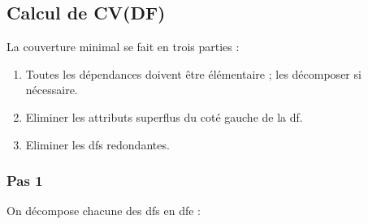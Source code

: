 \documentclass[a4paper,sffamily,12pt]{article}
\begin{document}
		\subsection{Calcul de CV(DF)}

			\vspace{0.5cm}

			\noindent La couverture minimal se fait en trois parties :

			\begin{enumerate}[label=\ding{228}]
				\item Toutes les dépendances doivent être élémentaire ; les décomposer si nécessaire.
				\item Eliminer les attributs superflus du coté gauche de la df.
				\item Eliminer les dfs redondantes.
			\end{enumerate}	
			
			\vspace{0.5cm}
				
			\subsubsection{Pas 1}

				\vspace{0.5cm}

				\noindent On décompose chacune des dfs en dfe : \\
\end{document}
